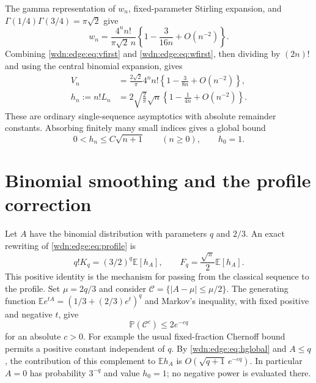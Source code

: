 \documentclass[11pt,letterpaper]{article}
\theoremstyle{remark}\newtheorem{remark}[theorem]{Remark}
\newcommand{\Prob}{\mathbb P}
\newcommand{\E}{\mathbb E}
\begin{document}
The gamma representation of $w_n$, fixed-parameter Stirling expansion,
and $\Gamma(1/4)\Gamma(3/4)=\pi\sqrt2$ give
\begin{equation}\label{wdn:edge:eq:wfirst}
 w_n=\frac{4^n n!}{\pi\sqrt2\,n}
       \left\{1-\frac3{16n}+O(n^{-2})\right\}.
\end{equation}
Combining \eqref{wdn:edge:eq:vfirst} and \eqref{wdn:edge:eq:wfirst}, then dividing by
$(2n)!$ and using the central binomial expansion, gives
\begin{align}
 V_n&=\frac{2\sqrt2}{\pi}4^nn!
          \left\{1-\frac3{8n}+O(n^{-2})\right\},\label{wdn:edge:eq:Vfirst}\\
 h_n:=n!L_n&=2\sqrt{\frac2\pi}\sqrt n
          \left\{1-\frac1{4n}+O(n^{-2})\right\}.
          \label{wdn:edge:eq:hfirst}
\end{align}
These are ordinary single-sequence asymptotics with absolute remainder
constants. Absorbing finitely many small indices gives a global bound
\begin{equation}\label{wdn:edge:eq:hglobal}
 0<h_n\le C\sqrt{n+1}\qquad(n\ge0),\qquad h_0=1.
\end{equation}

\section{Binomial smoothing and the profile correction}\label{wdn:edge:sec:smoothing}
Let $A$ have the binomial distribution with parameters $q$ and $2/3$.
An exact rewriting of \eqref{wdn:edge:eq:profile} is
\begin{equation}\label{wdn:edge:eq:binomial}
 q!K_q=(3/2)^q\E[h_A],\qquad
 F_q=\frac{\sqrt\pi}{2}\E[h_A].
\end{equation}
This positive identity is the mechanism for passing from the classical
sequence to the profile. Set $\mu=2q/3$ and consider
$\mathcal C=\{|A-\mu|\le\mu/2\}$.
The generating function
$\E e^{tA}=(1/3+(2/3)e^t)^q$ and Markov's inequality, with fixed
positive and negative $t$, give
\begin{equation}\label{wdn:edge:eq:bintail}
 \Prob(\mathcal C^c)\le2e^{-cq}
\end{equation}
for an absolute $c>0$. For example the usual fixed-fraction Chernoff
bound permits a positive constant independent of $q$.
By \eqref{wdn:edge:eq:hglobal} and $A\le q$, the contribution of this complement
to $\E h_A$ is $O(\sqrt{q+1}\,e^{-cq})$.
In particular $A=0$ has probability $3^{-q}$ and value $h_0=1$;
no negative power is evaluated there.
\end{document}
